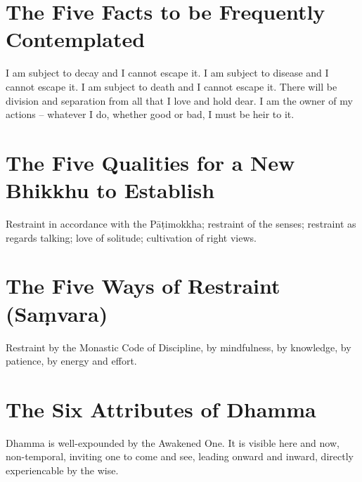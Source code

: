 \section*{The Five Facts to be Frequently Contemplated}

I am subject to decay and I cannot escape it. I am subject to disease and I
cannot escape it. I am subject to death and I cannot escape it. There will be
division and separation from all that I love and hold dear. I am the owner of my
actions -- whatever I do, whether good or bad, I must be heir to it.


\ifhandbookedition
\vspace*{-\baselineskip}
\fi

\section*{The Five Qualities for a New Bhikkhu to Establish}

Restraint in accordance with the Pāṭimokkha; restraint of the senses; restraint
as regards talking; love of solitude; cultivation of right views.


\ifhandbookedition
\vspace*{-\baselineskip}
\fi

\section*{The Five Ways of Restraint (Saṃvara)}

Restraint by the Monastic Code of Discipline, by mindfulness, by knowledge, by
patience, by energy and effort.


\ifhandbookedition
\vspace*{-\baselineskip}
\fi

\section*{The Six Attributes of Dhamma}


Dhamma is well-expounded by the Awakened One. It is visible here and now,
non-temporal, inviting one to come and see, leading onward and inward, directly
experiencable by the wise.


